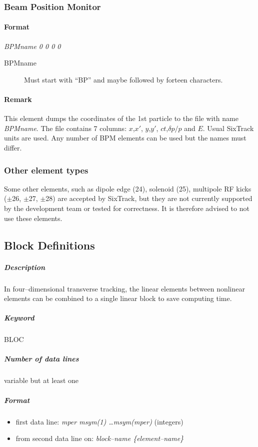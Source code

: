 \documentclass[a4paper,11pt]{report}
\begin{document}
\subsubsection{Beam Position Monitor} \label{BPM}
\paragraph{Format} {\em BPMname 0 0 0 0}
\begin{description}
\item [BPMname] Must start with ``BP'' and maybe followed by forteen characters.
\end{description}

\paragraph{Remark}
This element dumps the coordinates of the 1st particle to the file with name {\em BPMname}.
The file contains 7 columns: $x$,$x'$, $y$,$y'$, $ct$,$\delta p/p$ and $E$.
Usual SixTrack units are used. Any number of BPM elements can be used but
the names must differ. 

\subsubsection{Other element types}

Some other elements, such as dipole edge (24), solenoid (25), multipole RF kicks ($\pm$26, $\pm$27, $\pm$28) are accepted by SixTrack, but they are not currently supported by the development team or tested for correctness.
It is therefore advised to not use these elements.

\subsection{Block Definitions} \label{BloDef}

\subparagraph{Description} In four--dimensional transverse tracking,
the linear elements between nonlinear elements can be combined to a
single linear block to save computing time.

\subparagraph{Keyword} BLOC \subparagraph{Number of data lines}
variable but at least one

\subparagraph{Format}
\begin{itemize}
\item first data line: {\em mper msym(1) \dots msym(mper)}
  \/(integers)
\item from second data line on: {\em block--name \{element--name\} }
\end{itemize}
\end{document}

